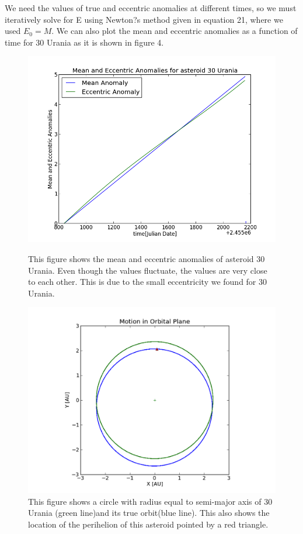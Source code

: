 \documentclass[letterpaper,12pt]{article}
\begin{document}
We need the values of true and eccentric anomalies at different times, so we must iteratively solve for E using Newton?s method given in equation 21, where we used \begin{math} E_{0}=M \end{math}. We can also plot the mean and eccentric anomalies as a function of time for 30 Urania as it is shown in figure 4.



\begin{figure}[ht]
\centering
\begin{minipage}[b]{0.4\linewidth}
  \includegraphics[scale=0.25]{mean_eccentric_urania.png}
  \caption{This figure shows the mean and eccentric anomalies of asteroid 30 Urania. Even though the values fluctuate, the values are very close to each other. This is due to the small eccentricity we found for 30 Urania.}
  \label{fig:minipage1}
\end{minipage}
\quad
\begin{minipage}[b]{0.4\linewidth}
  \includegraphics[scale=0.4]{orbit_urania.png}
  \caption{This figure shows a circle with radius equal to semi-major axis of 30 Urania (green line)and its true orbit(blue line). This also shows the location of the perihelion of this asteroid pointed by a red triangle.}
  \label{fig:minipage2}
\end{minipage}
\end{figure}
\end{document}
